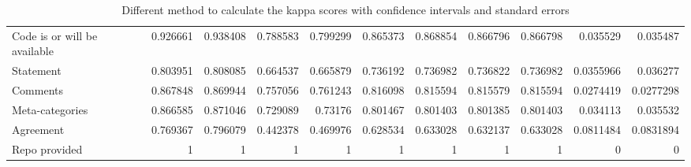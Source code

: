 \documentclass{article}
\begin{document}
\begin{table}[H]
\begin{tabular}{lrrrrrrrrrr}
 Code is or will be available           &                   0.926661 &               0.938408 &                  0.788583 &              0.799299 &                       0.865373 &                   0.868854 &                    0.866796 &                     0.866798 &             0.035529  &         0.035487  \\
 Statement                              &                   0.803951 &               0.808085 &                  0.664537 &              0.665879 &                       0.736192 &                   0.736982 &                    0.736822 &                     0.736982 &             0.0355966 &         0.036277  \\
 Comments                               &                   0.867848 &               0.869944 &                  0.757056 &              0.761243 &                       0.816098 &                   0.815594 &                    0.815579 &                     0.815594 &             0.0274419 &         0.0277298 \\
 Meta-categories                        &                   0.866585 &               0.871046 &                  0.729089 &              0.73176  &                       0.801467 &                   0.801403 &                    0.801385 &                     0.801403 &             0.034113  &         0.035532  \\
 Agreement                              &                   0.769367 &               0.796079 &                  0.442378 &              0.469976 &                       0.628534 &                   0.633028 &                    0.632137 &                     0.633028 &             0.0811484 &         0.0831894 \\
 Repo provided                          &                   1        &               1        &                  1        &              1        &                       1        &                   1        &                    1        &                     1        &             0         &         0         \\
\hline
\end{tabular}\caption{Different method to calculate the kappa scores with confidence intervals and standard errors}

\end{table}
\end{document}
